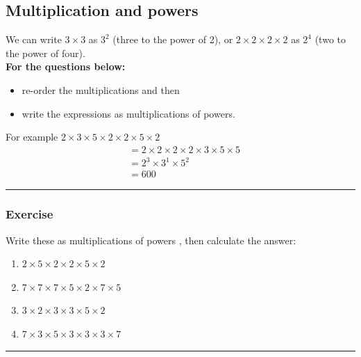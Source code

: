 \documentclass[a4paper,12pt]{article}
\newcommand\question{
	 \rule[0pt]{17cm}{0.5pt}\vspace{-0.5cm}
	\subsubsection{Exercise}

}
\newcommand\questionend{
	\rule[0pt]{17cm}{0.5pt}\vspace{0.0cm}\\
}
\begin{document}
\subsection{Multiplication and powers}
We can write $3 \times 3$ as $3^2$ (three to the power of 2), or $2\times 2 \times 2 \times 2$ as $2^4$ (two to the power of four).\\
\textbf{For the questions below:}
\begin{itemize}
	\item re-order the multiplications and then 
	\item write the expressions as multiplications of powers.
\end{itemize}
For example $2 \times 3 \times 5 \times 2 \times 2 \times 5 \times 2$
\begin{align*}
&=  2 \times 2 \times 2 \times 2 \times 3 \times 5 \times 5\\
&=  2^3 \times 3^1 \times 5^2\\
&= 600
\end{align*}
\newpage
\question
Write these as multiplications of powers , then calculate the answer:
\begin{multicols}{2}
\begin{enumerate}[label=\normalsize \alph*)~~~]
	\item $2 \times 5 \times 2 \times 2 \times 5 \times 2 $
	\item $7 \times 7 \times 7 \times 5 \times 2 \times 7 \times 5 $
	\item $3 \times 2 \times 3 \times 3 \times 5 \times 2  $
	\item $7 \times 3 \times 5 \times 3 \times 3 \times 3 \times 7 $
\end{enumerate}
\end{multicols}
\questionend
\end{document}
